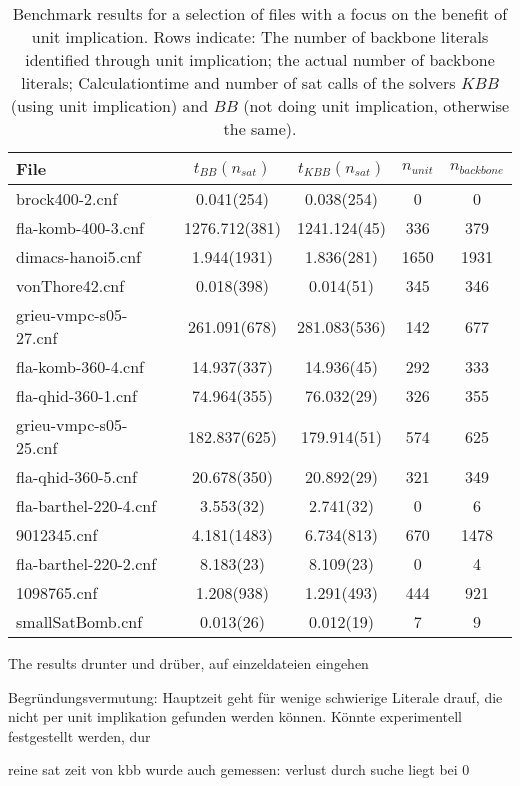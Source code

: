 \begin{table} %
\begin{tabular}{l| c c c c }
File & $t_{BB}(n_{sat})$ & $t_{KBB}(n_{sat})$ & $n_{unit}$ & $n_{backbone}$  \\
\hline
brock400-2.cnf & 0.041(254) & 0.038(254) & 0 & 0 \\
fla-komb-400-3.cnf & 1276.712(381) & 1241.124(45) & 336 & 379 \\
dimacs-hanoi5.cnf & 1.944(1931) & 1.836(281) & 1650 & 1931 \\
vonThore42.cnf & 0.018(398) & 0.014(51) & 345 & 346 \\
grieu-vmpc-s05-27.cnf & 261.091(678) & 281.083(536) & 142 & 677 \\
fla-komb-360-4.cnf & 14.937(337) & 14.936(45) & 292 & 333 \\
fla-qhid-360-1.cnf & 74.964(355) & 76.032(29) & 326 & 355 \\
grieu-vmpc-s05-25.cnf & 182.837(625) & 179.914(51) & 574 & 625 \\
fla-qhid-360-5.cnf & 20.678(350) & 20.892(29) & 321 & 349 \\
fla-barthel-220-4.cnf & 3.553(32) & 2.741(32) & 0 & 6 \\
9012345.cnf & 4.181(1483) & 6.734(813) & 670 & 1478 \\
fla-barthel-220-2.cnf & 8.183(23) & 8.109(23) & 0 & 4 \\
1098765.cnf & 1.208(938) & 1.291(493) & 444 & 921 \\
smallSatBomb.cnf & 0.013(26) & 0.012(19) & 7 & 9 \\
\end{tabular}
\caption{Benchmark results for a selection of files with a focus on the benefit of unit implication.
Rows indicate: The number of backbone literals identified through unit implication; the actual number of backbone literals; Calculationtime and number of sat calls of the solvers $KBB$ (using unit implication) and $BB$ (not doing unit implication, otherwise the same).}
\label{tab:bbkbb} %
\end{table}



The results drunter und drüber, auf einzeldateien eingehen

Begründungsvermutung: Hauptzeit geht für wenige schwierige Literale drauf, die nicht per unit implikation gefunden werden können. Könnte experimentell festgestellt werden, dur



reine sat zeit von kbb wurde auch gemessen: verlust durch suche liegt bei 0






